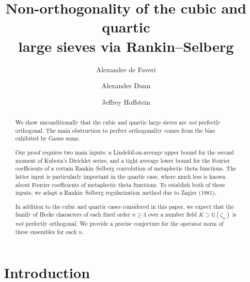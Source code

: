 \documentclass[12pt,reqno]{amsart}
\numberwithin{equation}{section}
\newcommand{\Q}{\mathbb{Q}}
\begin{document}
\author{Alexandre de Faveri}
\address{EPFL SB MATH, Station 10, 1015 Lausanne, Switzerland}

\author{Alexander Dunn}
\address{School of Mathematics, Georgia Institute of Technology,
    Atlanta, GA, USA}

\author{Jeffrey Hoffstein}
\address{Mathematics Department, Brown University,
Providence, RI, USA}

\title[Non-orthogonality of the cubic and quartic large sieves]{Non-orthogonality of the cubic and quartic \\ large sieves via Rankin--Selberg}

\begin{abstract}
    We show unconditionally that the cubic and quartic large sieves are \emph{not} perfectly orthogonal. The main obstruction to perfect orthogonality comes from the bias exhibited by Gauss sums.

    Our proof requires two main inputs: a Lindel\"{o}f-on-average upper bound for the second moment of Kubota's Dirichlet series, and a tight average lower bound for the Fourier coefficients of a certain Rankin--Selberg convolution of metaplectic theta functions. The latter input is particularly important in the quartic case, where much less is known about Fourier coefficients of metaplectic theta functions. To establish both of these inputs, we adapt a Rankin--Selberg regularization method due to Zagier (1981).

    In addition to the cubic and quartic cases considered in this paper, we expect that the family of Hecke characters of each fixed order $n \geq 3$ over a number field $K \supset \Q(\zeta_n)$ is \emph{not} perfectly orthogonal. We provide a precise conjecture for the operator norm of these ensembles for each $n$.
\end{abstract}

\maketitle

\tableofcontents


\section{Introduction}
\end{document}
